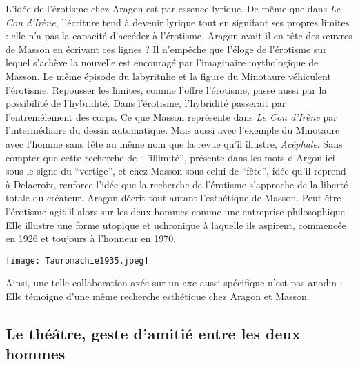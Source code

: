 L'idée de l'érotisme chez Aragon est par essence lyrique. De même que dans \emph{Le Con d'Irène}, l'écriture tend à devenir lyrique tout en signifant ses propres limites : elle n'a pas la capacité d'accéder à l'érotisme. Aragon avait-il en tête des \oe{}uvres de Masson en écrivant ces lignes ? Il n'empêche que l'éloge de l'érotisme sur lequel s'achève la nouvelle est encouragé par l'imaginaire mythologique de Masson. Le même épisode du labyritnhe et la figure du Minotaure véhiculent l'érotisme. Repousser les limites, comme l'offre l'érotisme, passe aussi par la possibilité de l'hybridité. Dans l'érotisme, l'hybridité passerait par l'entremêlement des corps. Ce que Masson représente dans \emph{Le Con d'Irène} par l'intermédiaire du dessin automatique. Mais aussi avec l'exemple du Minotaure avec l'homme sans tête au même nom que la revue qu'il illustre, \emph{Acéphale}. Sans compter que cette recherche de \enquote{l'illimité}, présente dans les mots d'Argon ici sous le signe du \enquote{vertige}, et chez Masson sous celui de \enquote{fête}, idée qu'il reprend à Delacroix, renforce l'idée que la recherche de l'érotisme s'approche de la liberté totale du créateur. Aragon décrit tout autant l'esthétique de Masson. Peut-être l'érotisme agit-il alors sur les deux hommes comme une entreprise philosophique. Elle illustre une forme utopique et uchronique à laquelle ils aspirent, commencée en 1926 et toujours à l'honneur en 1970. 


\begin{figure*}[htp]
   \centering
   \texttt{[image: Tauromachie1935.jpeg]}
	\caption{\cite{noel}}\label{fig:Tauromachie1935}
\end{figure*}


	Ainsi, une telle collaboration axée sur un axe aussi spécifique n’est pas anodin : Elle témoigne d’une même recherche esthétique chez Aragon et Masson. 
\subsection{Le théâtre, geste d'amitié entre les deux hommes}


